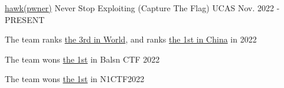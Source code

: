 

\begin{cventries}

  \cventry
    {\href{https://nese.team/members/active/}{\textcolor{awesome-skyblue}{hawk}(pwner)}} %
    {Never Stop Exploiting (Capture The Flag)} %
    {UCAS} %
    {Nov. 2022 - PRESENT} %
    {
      \begin{cvitems} %
        \item {The team ranks \href{https://ctftime.org/stats/2022}{\textcolor{awesome-skyblue}{the 3rd in World}}, and ranks \href{https://ctftime.org/stats/2022/CN}{\textcolor{awesome-skyblue}{the 1st in China}} in 2022}
        \item {The team wons \href{https://ctftime.org/event/1697}{\textcolor{awesome-skyblue}{the 1st}} in Balsn CTF 2022}
        \item {The team wons \href{https://ctftime.org/event/1759}{\textcolor{awesome-skyblue}{the 1st}} in N1CTF2022}
      \end{cvitems}
    }

\end{cventries}
